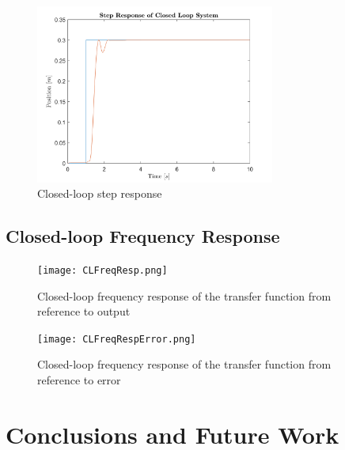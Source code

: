 \documentclass[11pt]{article}
\begin{document}
\begin{figure}[!h]
\centering
\includegraphics[width=0.7\textwidth]{CLStepResponse.png}
\caption{Closed-loop step response}
\label{fig:CLStepResponse}
\end{figure}

\subsection{Closed-loop Frequency Response}



\begin{figure}[!ht]
\centering
\texttt{[image: CLFreqResp.png]}
\caption{Closed-loop frequency response of the transfer function from reference to output}
\label{fig:CLFreqResponse}
\end{figure}




\begin{figure}[!ht]
\centering
\texttt{[image: CLFreqRespError.png]}
\caption{Closed-loop frequency response of the transfer function from reference to error}
\label{fig:CLFreqResponseError}
\end{figure}



\section{Conclusions and Future Work}

\begin{thebibliography}{9}
\end{thebibliography}
\end{document}
